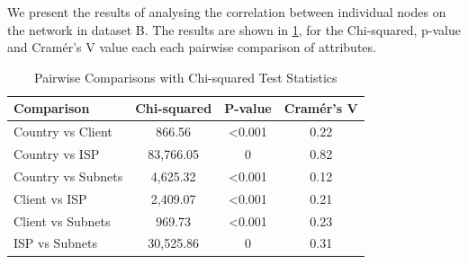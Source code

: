 \documentclass[conference]{IEEEtran}
\begin{document}
We present the results of analysing the correlation between individual nodes on the network in dataset B. The results are shown in \ref{tab:pairwise-comparisons}, for the Chi-squared, p-value and Cramér's V value each each pairwise comparison of attributes.

\begin{table}[h]
    \centering
    \renewcommand{\arraystretch}{1.5}
    \begin{tabular}{|p{2.5cm}|c|c|c|}
        \hline
        \textbf{Comparison} & \textbf{Chi-squared} & \textbf{P-value} & \textbf{Cramér's V} \\
        \hline
        Country vs Client & 866.56 & \textless 0.001 & 0.22 \\ \hline
        Country vs ISP & 83,766.05 & 0 & 0.82 \\ \hline
        Country vs Subnets & 4,625.32 & \textless 0.001 & 0.12 \\ \hline
        Client vs ISP & 2,409.07 & \textless 0.001 & 0.21 \\ \hline
        Client vs Subnets & 969.73 & \textless 0.001 & 0.23 \\ \hline
        ISP vs Subnets & 30,525.86 & 0 & 0.31 \\ \hline
    \end{tabular}
    \vspace{10pt}
    \caption{Pairwise Comparisons with Chi-squared Test Statistics}
    \label{tab:pairwise-comparisons}
\end{table}

\end{document}
